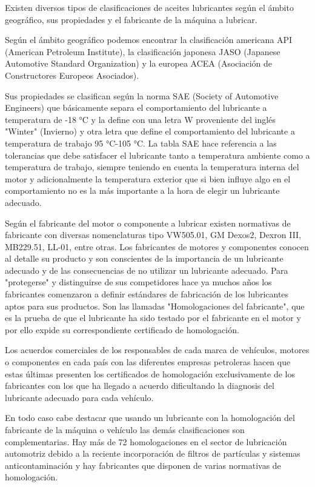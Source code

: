 Existen diversos tipos de clasificaciones de aceites lubricantes según el ámbito geográfico, sus propiedades y el fabricante de la máquina a lubricar.

Según el ámbito geográfico podemos encontrar la clasificación americana API (American Petroleum Institute), la clasificación japonesa JASO (Japanese Automotive Standard Organization) y la europea ACEA (Asociación de Constructores Europeos Asociados).

Sus propiedades se clasifican según la norma SAE (Society of Automotive Engineers) que básicamente separa el comportamiento del lubricante a temperatura de -18 °C y la define con una letra W proveniente del inglés "Winter" (Invierno) y otra letra que define el comportamiento del lubricante a temperatura de trabajo 95 °C-105 °C. La tabla SAE hace referencia a las tolerancias que debe satisfacer el lubricante tanto a temperatura ambiente como a temperatura de trabajo, siempre teniendo en cuenta la temperatura interna del motor y adicionalmente la temperatura exterior que si bien influye algo en el comportamiento no es la más importante a la hora de elegir un lubricante adecuado.


Según el fabricante del motor o componente a lubricar existen normativas de fabricante con diversas nomenclaturas tipo VW505.01, GM Dexos2, Dexron III, MB229.51, LL-01, entre otras. Los fabricantes de motores y componentes conocen al detalle su producto y son conscientes de la importancia de un lubricante adecuado y de las consecuencias de no utilizar un lubricante adecuado. Para "protegerse" y distinguirse de sus competidores hace ya muchos años los fabricantes comenzaron a definir estándares de fabricación de los lubricantes aptos para sus productos. Son las llamadas "Homologaciones del fabricante", que es la prueba de que el lubricante ha sido testado por el fabricante en el motor y por ello expide su correspondiente certificado de homologación.

Los acuerdos comerciales de los responsables de cada marca de vehículos, motores o componentes en cada país con las diferentes empresas petroleras hacen que estas últimas presenten los certificados de homologación exclusivamente de los fabricantes con los que ha llegado a acuerdo dificultando la diagnosis del lubricante adecuado para cada vehículo.

En todo caso cabe destacar que usando un lubricante con la homologación del fabricante de la máquina o vehículo las demás clasificaciones son complementarias. Hay más de 72 homologaciones en el sector de lubricación automotriz debido a la reciente incorporación de filtros de partículas y sistemas anticontaminación y hay fabricantes que disponen de varias normativas de homologación.
